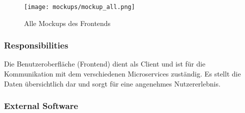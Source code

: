 \begin{figure}
\centering
\texttt{[image: mockups/mockup\_all.png]}
\caption{Alle Mockups des Frontends}
\label{fig:mockups_dashboard}
\end{figure}

\subsubsection{Responsibilities}
Die Benutzeroberfläche (Frontend) dient als Client und ist für die Kommunikation mit dem verschiedenen Microservices zuständig. Es stellt die Daten übersichtlich dar und sorgt für eine
angenehmes Nutzererlebnis.

\subsubsection{External Software}